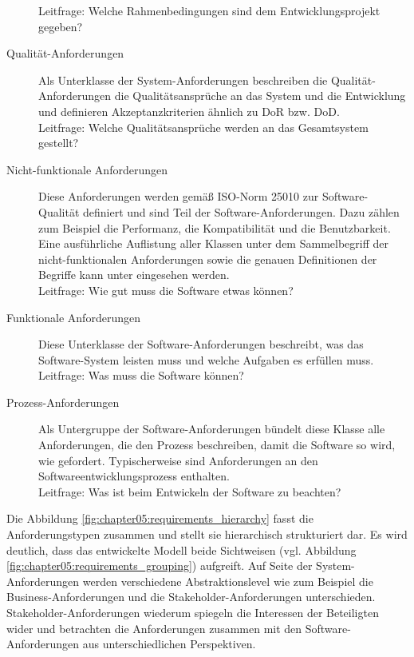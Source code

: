 \begin{description}
  Leitfrage: \glqq Welche Rahmenbedingungen sind dem Entwicklungsprojekt gegeben? \grqq
  \item[Qualität-Anforderungen] Als Unterklasse der System-Anforderungen beschreiben die Qualität-Anforderungen die Qualitätsansprüche an das System und die Entwicklung und definieren Akzeptanzkriterien ähnlich zu \ac{DoR} bzw. \ac{DoD}.\\
  Leitfrage: \glqq Welche Qualitätsansprüche werden an das Gesamtsystem gestellt? \grqq
  \item[Nicht-funktionale Anforderungen] Diese Anforderungen werden gemäß \ac{ISO}-Norm 25010 zur Software-Qualität definiert und sind Teil der Software-Anforderungen. Dazu zählen zum Beispiel die Performanz, die Kompatibilität und die Benutzbarkeit. Eine ausführliche Auflistung aller Klassen unter dem Sammelbegriff der nicht-funktionalen Anforderungen sowie die genauen Definitionen der Begriffe kann unter \cite{ISO25010} eingesehen werden.\\
  Leitfrage: \glqq Wie gut muss die Software etwas können? \grqq
  \item[Funktionale Anforderungen] Diese Unterklasse der Software-Anforderungen beschreibt, was das Software-System leisten muss und welche Aufgaben es erfüllen muss.\\
  Leitfrage: \glqq Was muss die Software können? \grqq
  \item[Prozess-Anforderungen] Als Untergruppe der Software-Anforderungen bündelt diese Klasse alle Anforderungen, die den Prozess beschreiben, damit die Software so wird, wie gefordert. Typischerweise sind Anforderungen an den Softwareentwicklungsprozess enthalten.\\
  Leitfrage: \glqq Was ist beim Entwickeln der Software zu beachten? \grqq
  \end{description}

Die Abbildung \ref{fig:chapter05:requirements_hierarchy} fasst die Anforderungstypen zusammen und stellt sie hierarchisch strukturiert dar. Es wird deutlich, dass das entwickelte Modell beide Sichtweisen (vgl. Abbildung \ref{fig:chapter05:requirements_grouping}) aufgreift. Auf Seite der System-Anforderungen werden verschiedene Abstraktionslevel wie zum Beispiel die Business-Anforderungen und die Stakeholder-Anforderungen unterschieden. Stakeholder-Anforderungen wiederum spiegeln die Interessen der Beteiligten wider und betrachten die Anforderungen zusammen mit den Software-Anforderungen aus unterschiedlichen Perspektiven.


